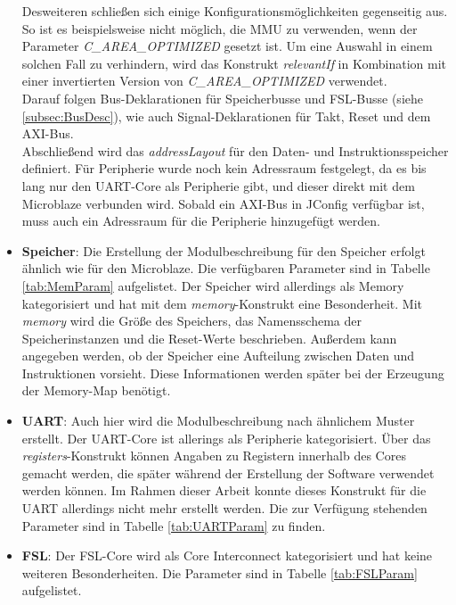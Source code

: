 \begin{itemize}
Desweiteren schließen sich einige Konfigurationsmöglichkeiten gegenseitig aus. So ist es beispielsweise nicht möglich, die MMU zu verwenden, wenn der Parameter \textit{C\_AREA\_OPTIMIZED} gesetzt ist. Um eine Auswahl in einem solchen Fall zu verhindern, wird das Konstrukt \textit{relevantIf} in Kombination mit einer invertierten Version von \textit{C\_AREA\_OPTIMIZED} verwendet.\\
Darauf folgen Bus-Deklarationen für Speicherbusse und FSL-Busse (siehe \ref{subsec:BusDesc}), wie auch Signal-Deklarationen für Takt, Reset und dem AXI-Bus.\\
Abschließend wird das \textit{addressLayout} für den Daten- und Instruktionsspeicher definiert. Für Peripherie wurde noch kein Adressraum festgelegt, da es bis lang nur den UART-Core als Peripherie gibt, und dieser direkt mit dem Microblaze verbunden wird. Sobald ein AXI-Bus in JConfig verfügbar ist, muss auch ein Adressraum für die Peripherie hinzugefügt werden.
\item \textbf{Speicher}: Die Erstellung der Modulbeschreibung für den Speicher erfolgt ähnlich wie für den Microblaze. Die verfügbaren Parameter sind in Tabelle \ref{tab:MemParam} aufgelistet. Der Speicher wird allerdings als Memory kategorisiert und hat mit dem \textit{memory}-Konstrukt eine Besonderheit. Mit \textit{memory} wird die Größe des Speichers, das Namensschema der Speicherinstanzen und die Reset-Werte beschrieben. Außerdem kann angegeben werden, ob der Speicher eine Aufteilung zwischen Daten und Instruktionen vorsieht. Diese Informationen werden später bei der Erzeugung der Memory-Map benötigt.
\item \textbf{UART}: Auch hier wird die Modulbeschreibung nach ähnlichem Muster erstellt. Der UART-Core ist allerings als Peripherie kategorisiert. Über das \textit{registers}-Konstrukt können Angaben zu Registern innerhalb des Cores gemacht werden, die später während der Erstellung der Software verwendet werden können. Im Rahmen dieser Arbeit konnte dieses Konstrukt für die UART allerdings nicht mehr erstellt werden. Die zur Verfügung stehenden Parameter sind in Tabelle \ref{tab:UARTParam} zu finden.
\item \textbf{FSL}: Der FSL-Core wird als Core Interconnect kategorisiert und hat keine weiteren Besonderheiten. Die Parameter sind in Tabelle \ref{tab:FSLParam} aufgelistet.
\end{itemize}

